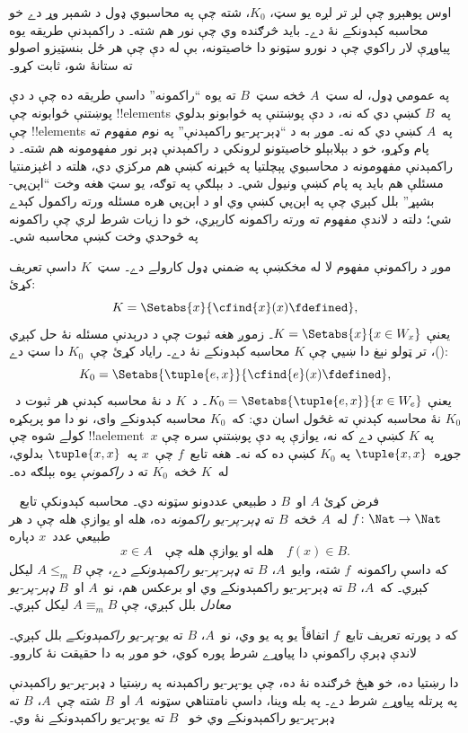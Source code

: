 \documentclass[../../../include/open-logic-section]{subfiles}
\begin{document}

\begin{explain}
اوس پوهېږو چې لږ تر لږه يو سټ، $K_0$، شته چې په محاسبوي ډول د شمېر
وړ دے خو محاسبه کېدونکے نۀ دے۔ بايد څرګنده وي چې نور هم شته۔ د
راکمېدنې طريقه يوه پياوړې لار راکوي چې د نورو سټونو دا خاصيتونه، بې
له دې چې هر ځل بنسټيزو اصولو ته ستانۀ شو، ثابت کړو۔

په عمومي ډول، له سټ~$A$ څخه سټ~$B$ ته يوه ``راکمونه'' داسې طريقه ده
چې د دې پوښتنې ځوابونه چې !!{element}s په~$B$ کښې دي که نه، د دې
پوښتنې په ځوابونو بدلوي چې !!{element}s په~$A$ کښې دي که نه۔ موږ به
د ``ډېر-پر-يو راکمېدنې'' په نوم مفهوم ته پام وکړو، خو د بېلابېلو
خاصيتونو لرونکي د راکمېدنې ډېر نور مفهومونه هم شته۔ د راکمېدنې
مفهومونه د محاسبوي پېچلتيا په څېړنه کښې هم مرکزي دي، هلته د اغېزمنتيا
مسئلې هم بايد په پام کښې ونيول شي۔ د بېلګې په توګه، يو سټ هغه وخت
``اېن‌پي-بشپړ'' بلل کېږي چې په اېن‌پي کښې وي او د اېن‌پي هره مسئله
ورته راکمول کېدے شي؛ دلته د لاندې مفهوم ته ورته راکمونه کارېږي، خو
دا زيات شرط لري چې راکمونه په څوحدي وخت کښې محاسبه شي۔

موږ د راکمونې مفهوم لا له مخکښې په ضمني ډول کارولے دے۔ سټ~$K$ داسې
تعريف کړئ:
\[
K = \Setabs{x}{\cfind{x}(x) \fdefined},
\]
يعنې $K = \Setabs{x}{x \in W_x}$۔ زموږ هغه ثبوت چې د درېدنې مسئله
نۀ حل کېږي ()، تر ټولو نېغ دا ښيي چې
$K$ محاسبه کېدونکے نۀ دے۔ راياد کړئ چې~$K_0$ دا سټ دے:
\[
K_0 = \Setabs{\tuple{e, x}}{\cfind{e}(x) \fdefined },
\]
يعنې $K_0 = \Setabs{\tuple{e,x}}{x \in W_e}$۔ د~$K$ د نۀ محاسبه
کېدنې هر ثبوت د~$K_0$ نۀ محاسبه کېدنې ته غځول اسان دي: که~$K_0$
محاسبه کېدونکے وای، نو دا مو پرېکړه کولے شوه چې !!a{element}~$x$ په
$K$ کښې دے که نه، يوازې په دې پوښتنې سره چې جوړه~$\tuple{x, x}$ په
$K_0$ کښې ده که نه۔ هغه تابع~$f$ چې~$x$ په~$\tuple{x, x}$ بدلوي،
له~$K$ څخه~$K_0$ ته د \emph{راکمونې} يوه بېلګه ده۔
\end{explain}

\begin{defn}
فرض کړئ $A$ او~$B$ د طبيعي عددونو سټونه دي۔ محاسبه کېدونکې تابع
~$f\colon \Nat \to \Nat$ له~$A$ څخه~$B$ ته \emph{ډېر-پر-يو راکمونه}
ده، هله او يوازې هله چې د هر طبيعي عدد~$x$ دپاره
\[
x \in A \quad \text{هله او يوازې هله چې} \quad f(x) \in B.
\]
که داسې راکمونه~$f$ شته، وايو~$A$، $B$ ته \emph{ډېر-پر-يو راکمېدونکے}
دے، چې $A \leq_m B$ ليکل کېږي۔ که~$A$، $B$ ته ډېر-پر-يو راکمېدونکے
وي او برعکس هم، نو~$A$ او~$B$ \emph{ډېر-پر-يو معادل} بلل کېږي، چې
$A \equiv_m B$ ليکل کېږي۔
\end{defn}

که د پورته تعريف تابع~$f$ اتفاقاً يو په يو وي، نو~$A$، $B$ ته
\emph{يو-پر-يو راکمېدونکے} بلل کېږي۔ لاندې ډېرې راکمونې دا پياوړے
شرط پوره کوي، خو موږ به دا حقيقت نۀ کاروو۔

\begin{digress}
دا رښتيا ده، خو هېڅ څرګنده نۀ ده، چې يو-پر-يو راکمېدنه په رښتيا د
ډېر-پر-يو راکمېدنې په پرتله پياوړے شرط دے۔ په بله وينا، داسې نامتناهي
سټونه~$A$ او~$B$ شته چې~$A$، $B$ ته ډېر-پر-يو راکمېدونکے وي خو
~$B$ ته يو-پر-يو راکمېدونکے نۀ وي۔
\end{digress}
\end{document}
